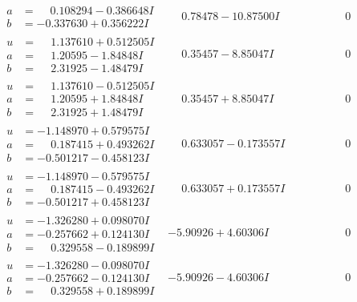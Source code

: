 \documentclass[1p]{elsarticle_modified}
\theoremstyle{definition}
\begin{document}
$$\begin{array}{c|c|c}
\begin{aligned}
a &= \phantom{-}0.108294 - 0.386648 I \\
b &= -0.337630 + 0.356222 I\end{aligned}
 & \phantom{-}0.78478 - 10.87500 I & \phantom{-0.000000 } 0 \\ \hline\begin{aligned}
u &= \phantom{-}1.137610 + 0.512505 I \\
a &= \phantom{-}1.20595 - 1.84848 I \\
b &= \phantom{-}2.31925 - 1.48479 I\end{aligned}
 & \phantom{-}0.35457 - 8.85047 I & \phantom{-0.000000 } 0 \\ \hline\begin{aligned}
u &= \phantom{-}1.137610 - 0.512505 I \\
a &= \phantom{-}1.20595 + 1.84848 I \\
b &= \phantom{-}2.31925 + 1.48479 I\end{aligned}
 & \phantom{-}0.35457 + 8.85047 I & \phantom{-0.000000 } 0 \\ \hline\begin{aligned}
u &= -1.148970 + 0.579575 I \\
a &= \phantom{-}0.187415 + 0.493262 I \\
b &= -0.501217 - 0.458123 I\end{aligned}
 & \phantom{-}0.633057 - 0.173557 I & \phantom{-0.000000 } 0 \\ \hline\begin{aligned}
u &= -1.148970 - 0.579575 I \\
a &= \phantom{-}0.187415 - 0.493262 I \\
b &= -0.501217 + 0.458123 I\end{aligned}
 & \phantom{-}0.633057 + 0.173557 I & \phantom{-0.000000 } 0 \\ \hline\begin{aligned}
u &= -1.326280 + 0.098070 I \\
a &= -0.257662 + 0.124130 I \\
b &= \phantom{-}0.329558 - 0.189899 I\end{aligned}
 & -5.90926 + 4.60306 I & \phantom{-0.000000 } 0 \\ \hline\begin{aligned}
u &= -1.326280 - 0.098070 I \\
a &= -0.257662 - 0.124130 I \\
b &= \phantom{-}0.329558 + 0.189899 I\end{aligned}
 & -5.90926 - 4.60306 I & \phantom{-0.000000 } 0 \\ \hline\begin{aligned}

\end{aligned}
\end{array}$$
\end{document}
